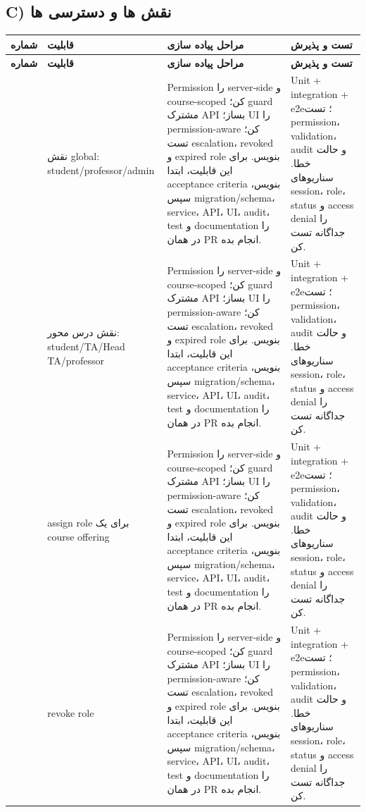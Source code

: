 \documentclass[11pt,a4paper]{article}
\begin{document}
\subsection{C) نقش ها و دسترسی ها}

\begin{longtable}{|>{\raggedleft\arraybackslash}p{}|>{\raggedleft\arraybackslash}p{}|>{\raggedleft\arraybackslash}p{}|>{\raggedleft\arraybackslash}p{}|}
\hline
\textbf{شماره} & \textbf{قابلیت} & \textbf{مراحل پیاده سازی} & \textbf{تست و پذیرش} \\\hline
\endfirsthead
\hline
\textbf{شماره} & \textbf{قابلیت} & \textbf{مراحل پیاده سازی} & \textbf{تست و پذیرش} \\\hline
\endhead
36 & نقش global: student/professor/admin & Permission را server-side و course-scoped کن؛ guard مشترک API بساز؛ UI را permission-aware کن؛ تست escalation، revoked و expired role بنویس. برای این قابلیت، ابتدا acceptance criteria بنویس، سپس migration/schema، service، API، UI، audit، test و documentation را در همان PR انجام بده. & Unit + integration + e2e؛ تست permission، validation، audit و حالت خطا. سناریوهای session، role، status و access denial را جداگانه تست کن. \\ \hline
37 & نقش درس محور: student/TA/Head TA/professor & Permission را server-side و course-scoped کن؛ guard مشترک API بساز؛ UI را permission-aware کن؛ تست escalation، revoked و expired role بنویس. برای این قابلیت، ابتدا acceptance criteria بنویس، سپس migration/schema، service، API، UI، audit، test و documentation را در همان PR انجام بده. & Unit + integration + e2e؛ تست permission، validation، audit و حالت خطا. سناریوهای session، role، status و access denial را جداگانه تست کن. \\ \hline
38 & assign role برای یک course offering & Permission را server-side و course-scoped کن؛ guard مشترک API بساز؛ UI را permission-aware کن؛ تست escalation، revoked و expired role بنویس. برای این قابلیت، ابتدا acceptance criteria بنویس، سپس migration/schema، service، API، UI، audit، test و documentation را در همان PR انجام بده. & Unit + integration + e2e؛ تست permission، validation، audit و حالت خطا. سناریوهای session، role، status و access denial را جداگانه تست کن. \\ \hline
39 & revoke role & Permission را server-side و course-scoped کن؛ guard مشترک API بساز؛ UI را permission-aware کن؛ تست escalation، revoked و expired role بنویس. برای این قابلیت، ابتدا acceptance criteria بنویس، سپس migration/schema، service، API، UI، audit، test و documentation را در همان PR انجام بده. & Unit + integration + e2e؛ تست permission، validation، audit و حالت خطا. سناریوهای session، role، status و access denial را جداگانه تست کن. \\ \hline

\end{longtable}
\end{document}
